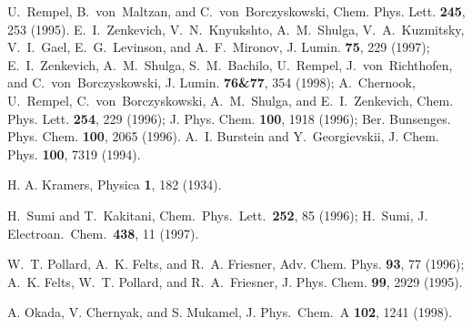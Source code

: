 \documentclass[12pt,twoside,a4paper]{report}
\begin{document}
{\begin{thebibliography}{999}
      U.~Rempel, B.~von~Maltzan, and C.~von~Borczyskowski, {  Chem. Phys. Lett.} {\bf 245}, 253 (1995).
      E.~I.~Zenkevich, V.~N.~Knyukshto, A.~M.~Shulga, V.~A.~Kuzmitsky, V.~I.~Gael, 
                  E.~G.~Levinson, and A.~F.~Mironov, {J. Lumin.} {\bf 75}, 229 (1997);
                  E.~I.~Zenkevich, A.~M.~Shulga, S.~M.~Bachilo, U.~Rempel, J.~von~Richthofen, 
                  and C.~von~Borczyskowski, {J.  Lumin.} {\bf 76\&77}, 354 (1998);
                  A.~Chernook, U.~Rempel, C.~von~Borczyskowski, 
                  A.~M.~Shulga, and E.~I.~Zenkevich,
                  { Chem. Phys. Lett.} {\bf 254}, 229 (1996);
                  { J. Phys. Chem.}  {\bf 100}, 1918 (1996);
                  { Ber. Bunsenges. Phys. Chem.}  {\bf 100}, 2065 (1996).
      A.~I. Burstein and Y.~Georgievskii, 
                  { J. Chem. Phys.}  {\bf 100}, 7319 (1994).


 H. A. Kramers, Physica {\bf 1}, 182 (1934).

      H.~Sumi and T.~Kakitani, Chem.\ Phys.\ Lett.\ 
                      {\bf 252}, 85 (1996); H.~Sumi, J. Electroan.\ Chem.\ 
                      {\bf 438}, 11 (1997).


      W.~T. Pollard, A.~K. Felts, and R.~A. Friesner, { Adv. Chem. Phys.}  {\bf 93}, 77 (1996);
                  A.~K. Felts, W.~T. Pollard, and R.~A.~Friesner, { J. Phys. Chem.}  {\bf 99}, 2929 (1995).


 A. Okada, V. Chernyak, and S. Mukamel, J. Phys.\ Chem.\ A {\bf 102}, 1241 (1998).






\end{thebibliography}}
\end{document}

